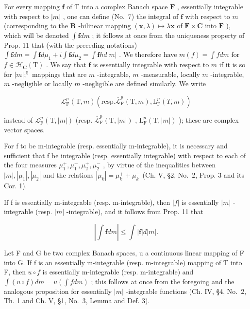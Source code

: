For every mapping \(\mathbf{f}\) of \(\mathrm{T}\) into a complex Banach space \(\mathbf{F}\) , essentially integrable with respect to \(|m|\) , one can define (No.~7) the integral of \(\mathbf{f}\) with respect to \(m\) (corresponding to the \(\mathbf{R}\) -bilinear mapping \((\mathbf{x},\lambda)\mapsto\lambda\mathbf{x}\) of \(\mathbf{F}\times\mathbf{C}\) into \(\mathbf{F}\) ), which will be denoted \(\int\mathbf{f}dm\) ; it follows at once from the uniqueness property of Prop. 11 that (with the preceding notations) \(\int\mathbf{f}dm=\int\mathbf{f}d\mu_{1}+i\int\mathbf{f}d\mu_{2}=\int\mathbf{f}hd|m|\) . We therefore have \(m(f)=\int fdm\) for \(f\in\mathcal{H}_{\mathbf{C}}(\mathrm{T})\) . We say that \(\mathbf{f}\) is essentially integrable with respect to \(m\) if it is so for \(|m|;^{5}\) mappings that are \(m\) -integrable, \(m\) -measurable, locally \(m\) -integrable, \(m\) -negligible or locally \(m\) -negligible are defined similarly. We write

\[
\mathcal {L} _ {\mathrm{F}} ^ {p} (\mathrm{T}, m) \left(\mathrm{resp.} \overline {{\mathcal {L}}} _ {\mathrm{F}} ^ {p} (\mathrm{T}, m), \mathrm{L} _ {\mathrm{F}} ^ {p} (T, m)\right)
\]

instead of \(\mathcal{L}_{\mathrm{F}}^{p}(\mathrm{T},|m|)\) (resp. \(\overline{\mathcal{L}}_{\mathrm{F}}^{p}(\mathrm{T},|m|)\) , \(\mathrm{L}_{\mathrm{F}}^{p}(\mathrm{T},|m|)\) ); these are complex vector spaces.

For f to be m-integrable (resp. essentially m-integrable), it is necessary and sufficient that f be integrable (resp. essentially integrable) with respect to each of the four measures \(\mu_{1}^{+}, \mu_{1}^{-}, \mu_{2}^{+}, \mu_{2}^{-}\) , by virtue of the inequalities between \(|m|, |\mu_{1}|, |\mu_{2}|\) and the relations \(|\mu_{k}| = \mu_{k}^{+} + \mu_{k}^{-}\) (Ch. V, §2, No.~2, Prop. 3 and its Cor. 1).

If f is essentially m-integrable (resp. m-integrable), then \(|f|\) is essentially \(|m|\) -integrable (resp. \(|m|\) -integrable), and it follows from Prop. 11 that

\[
\left| \int \mathbf {f} d m \right| \leqslant \int | \mathbf {f} | d | m |.\tag{7}
\]

Let F and G be two complex Banach spaces, u a continuous linear mapping of F into G. If f is an essentially m-integrable (resp. m-integrable) mapping of T into F, then \(u \circ f\) is essentially m-integrable (resp. m-integrable) and \(\int(u \circ f) dm = u (\int f dm)\) ; this follows at once from the foregoing and the analogous proposition for essentially \(|m|\) -integrable functions (Ch. IV, §4, No.~2, Th. 1 and Ch. V, §1, No.~3, Lemma and Def. 3).

